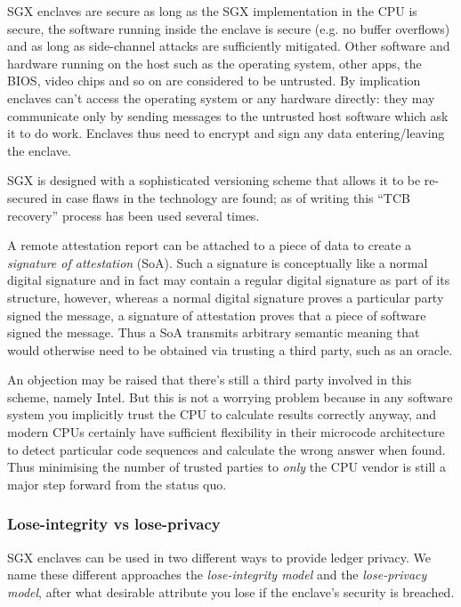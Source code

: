 \documentclass{article}
\begin{document}
SGX enclaves are secure as long as the SGX implementation in the CPU is secure, the software running inside the
enclave is secure (e.g. no buffer overflows) and as long as side-channel attacks are sufficiently mitigated. Other
software and hardware running on the host such as the operating system, other apps, the BIOS, video chips and so on
are considered to be untrusted. By implication enclaves can't access the operating system or any hardware directly:
they may communicate only by sending messages to the untrusted host software which ask it to do work. Enclaves thus
need to encrypt and sign any data entering/leaving the enclave.

SGX is designed with a sophisticated versioning scheme that allows it to be re-secured in case flaws in the
technology are found; as of writing this ``TCB recovery'' process has been used several times.

A remote attestation report can be attached to a piece of data to create a \emph{signature of attestation} (SoA).
Such a signature is conceptually like a normal digital signature and in fact may contain a regular digital signature
as part of its structure, however, whereas a normal digital signature proves a particular party signed the message,
a signature of attestation proves that a piece of software signed the message. Thus a SoA transmits arbitrary
semantic meaning that would otherwise need to be obtained via trusting a third party, such as an oracle.

An objection may be raised that there's still a third party involved in this scheme, namely Intel. But this
is not a worrying problem because in any software system you implicitly trust the CPU to calculate results
correctly anyway, and modern CPUs certainly have sufficient flexibility in their microcode architecture to detect
particular code sequences and calculate the wrong answer when found. Thus minimising the number of trusted parties
to \emph{only} the CPU vendor is still a major step forward from the status quo.

\subsubsection{Lose-integrity vs lose-privacy}

SGX enclaves can be used in two different ways to provide ledger privacy. We name these different approaches the
\emph{lose-integrity model} and the \emph{lose-privacy model}, after what desirable attribute you lose if the
enclave's security is breached.
\end{document}
